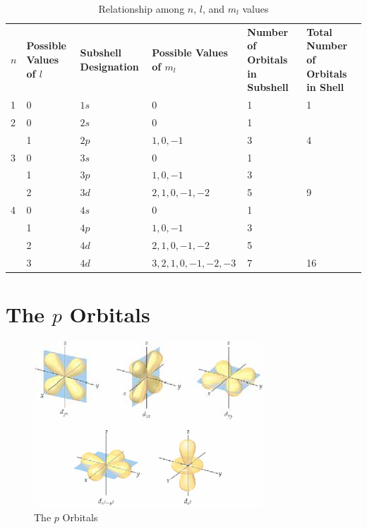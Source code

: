 \documentclass[
	chapter=7,
	title={Quantum Theory {\&} the Electronic Structure of Atoms},
	showanswers=true,
]{chem122notes}
\begin{document}
\begin{table}[H]
	\centering
	\caption{Relationship among $n$, $l$, and $m_{l}$ values}
	\label{tab:quantum-number-relationships}
	\begin{tabular}{C{0.05\textwidth} p{0.11\textwidth} p{0.15\textwidth} p{0.22\textwidth} p{0.18\textwidth} p{0.19\textwidth}}
		$n$ & \textbf{Possible Values of $l$} & \textbf{Subshell Designation} & \textbf{Possible Values of $m_{l}$} & \textbf{Number of Orbitals in Subshell} & \textbf{Total Number of Orbitals in Shell}\\
		1 & 0 & $1s$ & 0 & 1 & 1 \\
		2 & 0 & $2s$ & 0 & 1 \\
		  & 1 & $2p$ & $1, 0, -1$ & 3 & 4 \\
		3 & 0 & $3s$ & 0 & 1 \\
		  & 1 & $3p$ & $1, 0, -1$ & 3 \\
		  & 2 & $3d$ & $2, 1, 0, -1, -2$ & 5 & 9 \\
		4 & 0 & $4s$ & 0 & 1 \\
		  & 1 & $4p$ & $1, 0, -1$ & 3 \\
		  & 2 & $4d$ & $2, 1, 0, -1, -2$ & 5 \\
		  & 3 & $4d$ & $3, 2, 1, 0, -1, -2, -3$ & 7 & 16 \\
	\end{tabular}
\end{table}

\section{The $p$ Orbitals}\label{sec:the-p-orbitals}
\begin{figure}[H]
	\centering
	\includegraphics[width=\textwidth]{chapter7/d-orbitals}
	\caption{The $p$ Orbitals}
	\label{fig:p-orbitals}
\end{figure}
\end{document}
